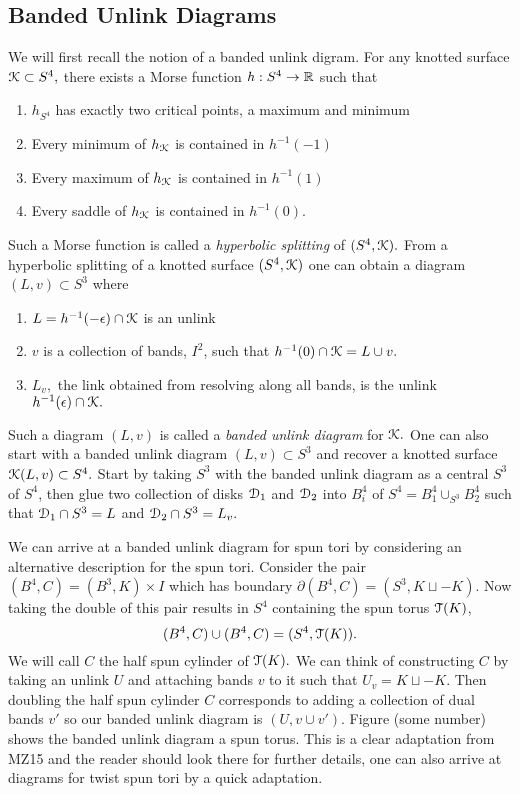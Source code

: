 \documentclass[a4paper, 12 pt, reqno]{amsart}
\theoremstyle{definition}
\theoremstyle{remark}
\begin{document}
\subsection{Banded Unlink Diagrams} 
We will first recall the notion of a banded unlink digram. For any knotted surface $\mathcal K \subset S^{4},$ there exists a Morse function $h: S^{4} \rightarrow \mathbb R$ such that 
\begin{enumerate}
\item $h_{S^{4}}$ has exactly two critical points, a maximum and minimum
\item Every minimum of $h_{\mathcal K}$ is contained in $h^{-1}(-1)$
\item Every maximum of $h_{\mathcal K}$ is contained in $h^{-1}(1)$
\item Every saddle of $h_{\mathcal K}$ is contained in $h^{-1}(0).$
\end{enumerate}
Such a Morse function is called a {\em hyperbolic splitting} of $(S^{4}, \mathcal K).$ From a hyperbolic splitting of a knotted surface $(S^{4}, \mathcal K)$ one can obtain a diagram $(L, v) \subset S^{3}$ where 
\begin{enumerate}
\item $L = h^{-1}({-\epsilon}) \cap \mathcal K$ is an unlink
\item $v$ is a collection of bands, $I^{2}$, such that $h^{-1}(0) \cap \mathcal K = L \cup v.$
\item $L_{v},$ the link obtained from resolving along all bands, is the unlink $h^{-1}(\epsilon) \cap \mathcal K.$
\end{enumerate}
Such a diagram $(L, v)$ is called a {\em banded unlink diagram} for $\mathcal K.$ One can also start with a banded unlink diagram $(L, v) \subset S^{3}$ and recover a knotted surface $\mathcal K(L, v) \subset S^{4}.$ Start by taking $S^{3}$ with the banded unlink diagram as a central $S^{3}$ of $S^{4}$, then glue two collection of disks $\mathcal D_{1}$ and $\mathcal D_{2}$ into $B^{4}_{i}$ of $S^{4} = B^{4}_{1} \cup_{S^{3}} B^{4}_{2}$ such that $\mathcal D_{1} \cap S^{3} = L$ and $\mathcal D_{2} \cap S^{3} = L_{v}.$


We can arrive at a banded unlink diagram for spun tori by considering an alternative description for the spun tori.
Consider the pair $(B^{4}, C) = (B^{3}, K) \times I$ which has boundary $\partial(B^{4}, C) = (S^{3}, K \sqcup -K).$ Now taking the double of this pair results in $S^{4}$ containing the spun torus $\mathcal T(K)$, $$(B^{4}, C) \cup (B^{4}, C) = (S^{4}, \mathcal T(K)).$$ \newline
\indent We will call $C$ the half spun cylinder of $\mathcal T(K).$ We can think of constructing $C$ by taking an unlink $U$ and attaching bands $v$ to it such that $U_{v} = K \sqcup - K.$ Then doubling the half spun cylinder $C$ corresponds to adding a collection of dual bands $v'$ so our banded unlink diagram is $(U, v \cup v').$ Figure (some number) shows the banded unlink diagram a spun torus. This is a clear adaptation from MZ15 and the reader should look there for further details, one can also arrive at diagrams for twist spun tori by a quick adaptation.   
\end{document}
